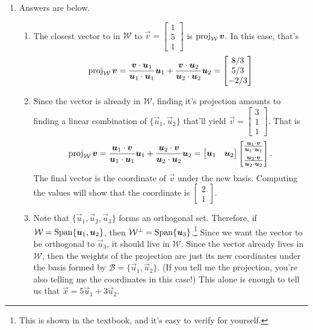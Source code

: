 \begin{enumerate}
	\item[\textbf{Q5}]  Answers are below.
			\begin{enumerate}
				\item The closest vector to in \(\mathcal{W}\) to \(\vec{v} = \begin{bmatrix}1 \\ 5 \\ 1\end{bmatrix}\) is \(\operatorname{proj}_\mathcal{W} \bm{v}.\)
				In this case, that's 
				\[\operatorname{proj}_\mathcal{W} \bm{v}
				  = \frac{\bm{v} \cdot \bm{u}_1}{\bm{u}_1 \cdot \bm{u}_1}\bm{u}_1 
				   + \frac{\bm{v} \cdot \bm{u}_2}{\bm{u}_2 \cdot \bm{u}_2}\bm{u}_2 = \begin{bmatrix}8/3 \\ 5/3 \\ -2/3\end{bmatrix}\]
				\item Since the vector is already in \(\mathcal{W}\), finding it's projection amounts to finding a linear combination of \(\{\vec{u}_1, \vec{u}_2\}\)
					that'll yield \(\vec{v} = \begin{bmatrix}3 \\ 1 \\ 1\end{bmatrix}\). That is 
					\[\operatorname{proj}_\mathcal{W} \bm{v} = \frac{\bm{u}_1 \cdot \bm{v}}{\bm{u}_1 \cdot \bm{u}_1}\bm{u}_1 + \frac{\bm{u}_2 \cdot \bm{v}}{\bm{u}_2 \cdot \bm{u}_2}\bm{u}_2 = \begin{bmatrix}\bm{u}_1 & \bm{u}_2\end{bmatrix}\begin{bmatrix}\frac{\bm{u}_1 \cdot \bm{v}}{\bm{u}_1 \cdot \bm{u}_1}\\[0.5em] \frac{\bm{u}_2 \cdot \bm{v}}{\bm{u}_2 \cdot \bm{u}_2}\end{bmatrix}.\] The final vector is the coordinate of \(\vec{v}\) under the new basis. 
					Computing the values will show that the coordinate is \(\begin{bmatrix}2 \\ 1\end{bmatrix}\).
				\item Note that \(\{\vec{u}_1, \vec{u}_2, \vec{u}_3\}\) forms an orthogonal set. Therefore, if \(\mathcal{W} =  \operatorname{Span}\{\bm{u}_1, \bm{u}_2\}\),
					 then \(\mathcal{W}^\perp = \operatorname{Span}\{\bm{u}_3\}\).\footnote{This is shown in the textbook, and it's easy to verify for yourself.} Since we want
					 the vector to be orthogonal to \(\vec{u}_3\), it should live in \(\mathcal{W}\). Since the vector already lives in \(\mathcal{W}\), then the weights of the 
					projection are just its new coordinates under the basis formed by \(\mathcal{B} = \{\vec{u}_1, \vec{u}_2\}.\) (If you tell me the
					projection, you're also telling me the coordinates in this case!) This alone is enough to tell us that \(\vec{x} = 5\vec{u}_1 + 3\vec{u}_2.\)
				\end{enumerate}


\end{enumerate}

